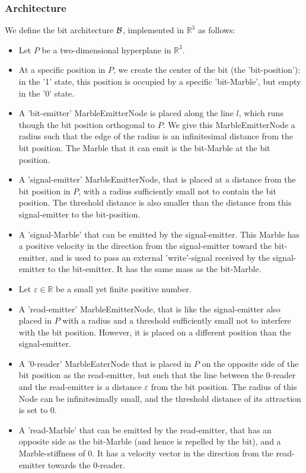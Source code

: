 \subsubsection{Architecture}
We define the bit architecture $\mathcal{B}$, implemented in $\mathbb{R}^3$ as follows:
\begin{itemize}
    \item Let $P$ be a two-dimensional hyperplane in $\mathbb{R}^3$.
    \item At a specific position in $P$, we create the center of the bit (the 'bit-position'): in the '1' state, this position is occupied by a specific 'bit-Marble', but empty in the '0' state.
    \item A 'bit-emitter' MarbleEmitterNode is placed along the line $l$, which runs though the bit position orthogonal to $P$. We give this MarbleEmitterNode a radius such that the edge of the radius is an infinitesimal distance from the bit position. The Marble that it can emit is the bit-Marble at the bit position.
    \item A 'signal-emitter' MarbleEmitterNode, that is placed at a distance from the bit position in $P$, with a radius sufficiently small not to contain the bit position. The threshold distance is also smaller than the distance from this signal-emitter to the bit-position.
    \item A 'signal-Marble' that can be emitted by the signal-emitter. This Marble has a positive velocity in the direction from the signal-emitter toward the bit-emitter, and is used to pass an external 'write'-signal received by the signal-emitter to the bit-emitter. It has the same mass as the bit-Marble.
    \item Let $\varepsilon \in \mathbb{R}$ be a small yet finite positive number.
    \item A 'read-emitter' MarbleEmitterNode, that is like the signal-emitter also placed in $P$ with a radius and a threshold sufficiently small not to interfere with the bit position. However, it is placed on a different position than the signal-emitter. 
    \item A '0-reader' MarbleEaterNode that is placed in $P$ on the opposite side of the bit position as the read-emitter, but such that the line between the 0-reader and the read-emitter is a distance $\varepsilon$ from the bit position. The radius of this Node can be infinitesimally small, and the threshold distance of its attraction is set to 0.
    \item A 'read-Marble' that can be emitted by the read-emitter, that has an opposite side as the bit-Marble (and hence is repelled by the bit), and a Marble-stiffness of 0. It has a velocity vector in the direction from the read-emitter towards the 0-reader.

\end{itemize}
